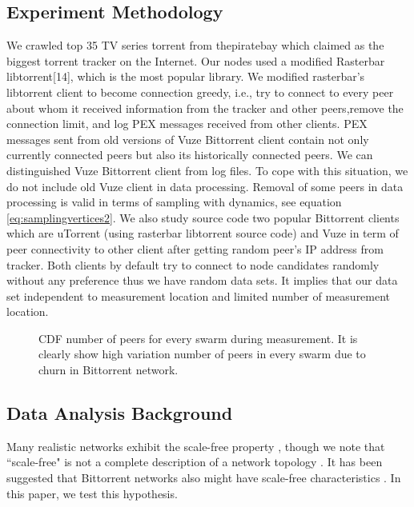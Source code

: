 \documentclass[10pt,conference,letterpaper]{IEEEtran}
\begin{document}
\subsection{Experiment Methodology}
We crawled top 35 TV series torrent from thepiratebay which claimed as the biggest torrent tracker on the Internet.
Our nodes used a modified Rasterbar libtorrent[14], which is the most popular library.  %
We modified rasterbar's libtorrent client to become connection greedy, i.e., try to connect to every peer about whom it received information from the tracker and other peers,remove the connection limit, and log PEX messages received from other clients.
PEX messages sent from old versions of Vuze Bittorrent client contain not only currently connected peers but also its historically connected peers. 
We can distinguished Vuze Bittorrent client from log files.
To cope with this situation, we do not include old Vuze client in data processing. 
Removal of some peers in data processing is valid in terms of sampling with dynamics, see equation \ref{eq:samplingvertices2}.
We also study source code two popular Bittorrent clients which are uTorrent (using rasterbar libtorrent source code) and Vuze in term of peer connectivity to other client after getting random peer's IP address from tracker.
Both clients by default try to connect to node candidates randomly without any preference thus we have random data sets.
It implies that our data set independent to measurement location and limited number of measurement location.

\begin{figure}
\centering
{}
\caption{CDF number of peers for every swarm during measurement. It is clearly show high variation number of peers in every swarm due to churn in Bittorrent network.} 
\label{fig:num_peers}
\end{figure}

\subsection{Data Analysis Background}
Many realistic networks exhibit the scale-free property \cite{clauset2009power}, though we note that ``scale-free" is not a complete description of a network topology \cite{doyle2005robust}\cite{mahadevan2006systematic}. 
It has been suggested that Bittorrent networks also might have scale-free characteristics \cite{dale2008evolution}. 
In this paper, we test this hypothesis. 
\end{document}
